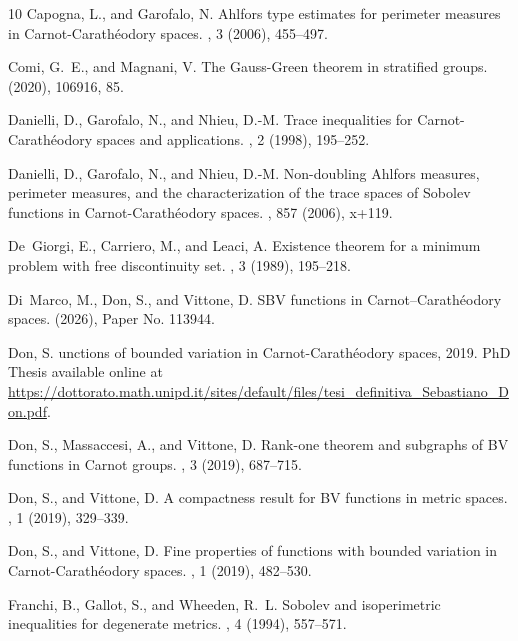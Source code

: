 \documentclass[12pt,a4paper]{amsart}
\theoremstyle{definition}
\theoremstyle{plain}
\begin{document}
\begin{thebibliography}{10}
{\sc Capogna, L., and Garofalo, N.}
\newblock Ahlfors type estimates for perimeter measures in {C}arnot-{C}arath\'eodory spaces.
, 3 (2006), 455--497.

{\sc Comi, G.~E., and Magnani, V.}
\newblock The {G}auss-{G}reen theorem in stratified groups.
 (2020), 106916, 85.

{\sc Danielli, D., Garofalo, N., and Nhieu, D.-M.}
\newblock Trace inequalities for {C}arnot-{C}arath\'eodory spaces and applications.
, 2 (1998), 195--252.

{\sc Danielli, D., Garofalo, N., and Nhieu, D.-M.}
\newblock Non-doubling {A}hlfors measures, perimeter measures, and the characterization of the trace spaces of {S}obolev functions in {C}arnot-{C}arath\'eodory spaces.
, 857 (2006), x+119.

{\sc De~Giorgi, E., Carriero, M., and Leaci, A.}
\newblock Existence theorem for a minimum problem with free discontinuity set.
, 3 (1989), 195--218.

{\sc Di~Marco, M., Don, S., and Vittone, D.}
\newblock S{BV} functions in {C}arnot--{C}arath\'eodory spaces.
 (2026), Paper No. 113944.

{\sc Don, S.}
unctions of bounded variation in {C}arnot-{C}arathéodory spaces, 2019.
\newblock PhD Thesis available online at \url{https://dottorato.math.unipd.it/sites/default/files/tesi_definitiva_Sebastiano_Don.pdf}.

{\sc Don, S., Massaccesi, A., and Vittone, D.}
\newblock Rank-one theorem and subgraphs of {BV} functions in {C}arnot groups.
, 3 (2019), 687--715.

{\sc Don, S., and Vittone, D.}
\newblock A compactness result for {BV} functions in metric spaces.
, 1 (2019), 329--339.

{\sc Don, S., and Vittone, D.}
\newblock Fine properties of functions with bounded variation in {C}arnot-{C}arath\'{e}odory spaces.
, 1 (2019), 482--530.

{\sc Franchi, B., Gallot, S., and Wheeden, R.~L.}
\newblock Sobolev and isoperimetric inequalities for degenerate metrics.
, 4 (1994), 557--571.


\end{thebibliography}
\end{document}
